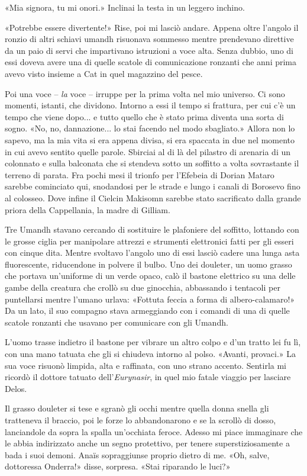 «Mia signora, tu mi onori.» Inclinai la testa in un leggero inchino.

«Potrebbe essere divertente!» Rise, poi mi lasciò andare. Appena oltre
l'angolo il ronzio di altri schiavi umandh risuonava sommesso mentre
prendevano direttive da un paio di servi che impartivano istruzioni a
voce alta. Senza dubbio, uno di essi doveva avere una di quelle scatole
di comunicazione ronzanti che anni prima avevo visto insieme a Cat in
quel magazzino del pesce.

Poi una voce -- \emph{la} voce -- irruppe per la prima volta nel mio
universo. Ci sono momenti, istanti, che dividono. Intorno a essi il
tempo si frattura, per cui c'è un tempo che viene dopo... e tutto quello
che è stato prima diventa una sorta di sogno. «No, no, dannazione... lo
stai facendo nel modo sbagliato.» Allora non lo sapevo, ma la mia vita
si era appena divisa, si era spaccata in due nel momento in cui avevo
sentito quelle parole. Sbirciai al di là del pilastro di arenaria di un
colonnato e sulla balconata che si stendeva sotto un soffitto a volta
sovrastante il terreno di parata. Fra pochi mesi il trionfo per
l'Efebeia di Dorian Mataro sarebbe cominciato qui, snodandosi per le
strade e lungo i canali di Borosevo fino al colosseo. Dove infine il
Cielcin Makisomn sarebbe stato sacrificato dalla grande priora della
Cappellania, la madre di Gilliam.

Tre Umandh stavano cercando di sostituire le plafoniere del soffitto,
lottando con le grosse ciglia per manipolare attrezzi e strumenti
elettronici fatti per gli esseri con cinque dita. Mentre svoltavo
l'angolo uno di essi lasciò cadere una lunga asta fluorescente,
riducendone in polvere il bulbo. Uno dei douleter, un uomo grasso che
portava un'uniforme di un verde opaco, calò il bastone {elettrico} su
una delle gambe della creatura che crollò su due {ginocchia},
{abbassando} i tentacoli per puntellarsi mentre l'umano urlava: «Fottuta
feccia a forma di albero-calamaro!» Da un lato, il suo compagno stava
armeggiando con i comandi di una di quelle scatole ronzanti che usavano
per comunicare con gli Umandh.

L'uomo trasse indietro il bastone per vibrare un altro colpo e d'un
tratto lei fu lì, con una mano tatuata che gli si chiudeva intorno al
polso. «Avanti, provaci.» La sua voce risuonò limpida, alta e raffinata,
con uno strano accento. Sentirla mi ricordò il dottore tatuato
dell'\emph{Eurynasir}, in quel mio fatale viaggio per lasciare Delos.

Il grasso douleter si tese e sgranò gli occhi mentre quella donna snella
gli tratteneva il braccio, poi le forze lo abbandonarono e se la scrollò
di dosso, lanciandole da sopra la spalla un'occhiata feroce. Adesso mi
piace immaginare che le abbia indirizzato anche un segno protettivo, per
tenere superstiziosamente a bada i suoi demoni. Anaïs sopraggiunse
proprio dietro di me. «Oh, salve, dottoressa Onderra!» disse, sorpresa.
«Stai riparando le luci?»

